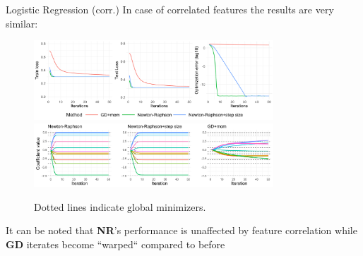 \documentclass[11pt,compress,t,notes=noshow, xcolor=table]{beamer}
\begin{document}
\begin{vbframe}{Logistic Regression (corr.)}
\vspace{-0.4cm}
In case of correlated features the results are very similar:
\begin{figure}
            \includegraphics[width=0.8\textwidth]{slides/05-multivariate-second-order/figure_man/simu-newton/NR_GD_log_indep_50iters_corr.pdf} \\
             \includegraphics[width=0.8\textwidth]{slides/05-multivariate-second-order/figure_man/simu-newton/NR_GD_log_coef_50indep_corr.pdf}\\
            \begin{footnotesize}
            Dotted lines indicate global minimizers.
            \end{footnotesize}
\end{figure}
It can be noted that \textbf{NR}'s performance is unaffected by feature correlation while \textbf{GD} iterates become ``warped`` compared to before
\end{vbframe}
\end{document}
